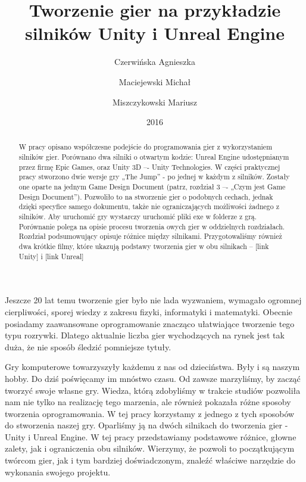 \documentclass[brudnopis]{xmgr}
\author   {Czerwińska Agnieszka}
\author   {Maciejewski Michał}
\author   {Miszczykowski Mariusz}
\title    {Tworzenie gier na przykładzie silników Unity i Unreal Engine}
\date     {2016}
\begin{document}
\begin{abstract}
W pracy opisano współczesne podejście do programowania gier z wykorzystaniem silników gier. Porównano dwa silniki o otwartym kodzie: Unreal Engine udostępnianym przez firmę Epic Games, oraz Unity 3D –- Unity Technologies. W części praktycznej pracy stworzono dwie wersje gry „The Jump” - po jednej w każdym z silników. Zostały one oparte na jednym Game Design Document (patrz, rozdział 3 –- „Czym jest Game Design Document”). Pozwoliło to na stworzenie gier o podobnych cechach, jednak dzięki specyfice samego dokumentu, także nie ograniczających możliwości żadnego z silników. Aby uruchomić gry wystarczy uruchomić pliki exe w folderze z grą. Porównanie polega na opisie procesu tworzenia owych gier w oddzielnych rozdziałach. Rozdział podsumowujący opisuje różnice między silnikami. Przygotowaliśmy również dwa krótkie filmy, które ukazują podstawy tworzenia gier w obu silnikach -- [link Unity] i [link Unreal]
\end{abstract}


\maketitle

\introduction

Jeszcze 20 lat temu tworzenie gier było nie lada wyzwaniem, wymagało ogromnej cierpliwości, sporej wiedzy z zakresu fizyki, informatyki i matematyki. Obecnie posiadamy zaawansowane oprogramowanie znacząco ułatwiające tworzenie tego typu rozrywki. Dlatego aktualnie liczba gier wychodzących na rynek jest tak duża, że nie sposób śledzić pomniejsze tytuły.

Gry komputerowe towarzyszyły każdemu z nas od dzieciństwa. Były i są naszym hobby. Do dziś poświęcamy im mnóstwo czasu. Od zawsze marzyliśmy, by zacząć tworzyć swoje własne gry.
Wiedza, którą zdobyliśmy w trakcie studiów pozwoliła nam nie tylko na realizację tego marzenia, ale również pokazała różne sposoby tworzenia oprogramowania. W tej pracy korzystamy z jednego z tych sposobów do stworzenia naszej gry. Oparliśmy ją na dwóch silnikach do tworzenia gier - Unity i Unreal Engine. W tej pracy przedstawiamy podstawowe różnice, głowne zalety, jak i ograniczenia obu silników. Wierzymy, że pozwoli to początkującym twórcom gier, jak i tym bardziej doświadczonym, znaleźć właściwe narzędzie do wykonania swojego projektu.
\end{document}
